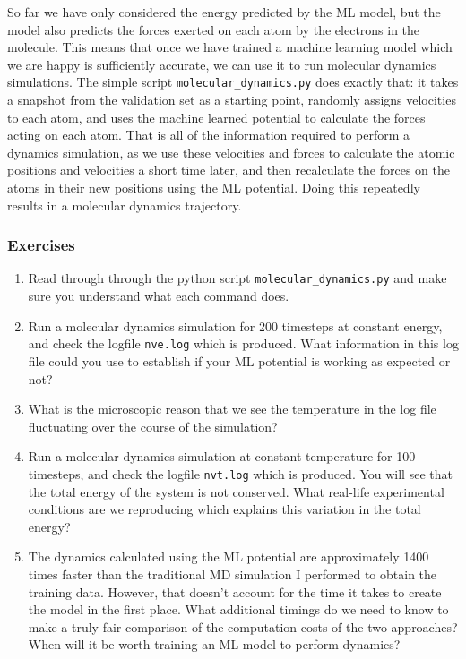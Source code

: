 \documentclass{article}
\begin{document}

So far we have only considered the energy predicted by the ML model, but the model also predicts the forces exerted on each atom by the electrons in the molecule. This means that once we have trained a machine learning model which we are happy is sufficiently accurate, we can use it to run molecular dynamics simulations. The simple script \verb|molecular_dynamics.py| does exactly that: it takes a snapshot from the validation set as a starting point, randomly assigns velocities to each atom, and uses the machine learned potential to calculate the forces acting on each atom. That is all of the information required to perform a dynamics simulation, as we use these velocities and forces to calculate the atomic positions and velocities a short time later, and then recalculate the forces on the atoms in their new positions using the ML potential. Doing this repeatedly results in a molecular dynamics trajectory.

\subsubsection*{Exercises}

\begin{enumerate}

\item Read through through the python script \verb|molecular_dynamics.py| and make sure you understand what each command does.
\item Run a molecular dynamics simulation for 200 timesteps at constant energy, and check the logfile \verb|nve.log| which is produced. What information in this log file could you use to establish if your ML potential is working as expected or not?
\item What is the microscopic reason that we see the temperature in the log file fluctuating over the course of the simulation?
\item Run a molecular dynamics simulation at constant temperature for 100 timesteps, and check the logfile \verb|nvt.log| which is produced. You will see that the total energy of the system is not conserved. What real-life experimental conditions are we reproducing which explains this variation in the total energy?
\item The dynamics calculated using the ML potential are approximately 1400 times faster than the traditional MD simulation I performed to obtain the training data. However, that doesn't account for the time it takes to create the model in the first place. What additional timings do we need to know to make a truly fair comparison of the computation costs of the two approaches? When will it be worth training an ML model to perform dynamics?

\end{enumerate}
\end{document}
